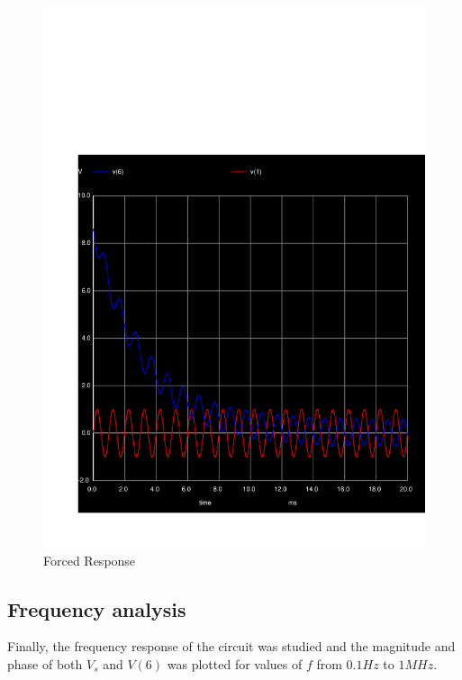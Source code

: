   \begin{figure}[H] \centering
    \includegraphics[width=1\linewidth]{../sim/trans4.pdf}
    \caption{Forced Response}
    \label{fig:p4}
    \end{figure}

  \subsection{Frequency analysis}

Finally, the frequency response of the circuit was studied and the magnitude and phase
of both $V_s$ and $V(6)$ was plotted for values of $f$ from $0.1 Hz$ to $1 MHz$.


